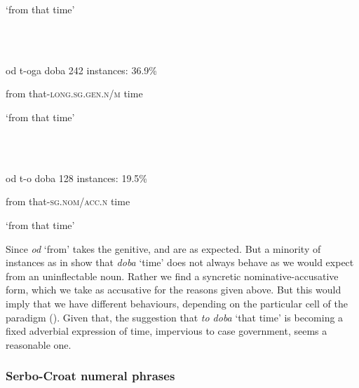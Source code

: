 \documentclass[output=paper]{langscibook}
\begin{document}
  ‘from that time’

\ea%
    \label{ex:key:21}
    \gll \\
         \\
    \glt
    \z %

          od  t-oga   doba    242 instances: 36.9\%

  from  that-\textsc{long}.\textsc{sg.gen.n/m}  time

  ‘from that time’

\ea%
    \label{ex:key:22}
    \gll \\
         \\
    \glt
    \z %

          od  t-o  doba    128 instances: 19.5\%

  from  that-\textsc{sg.nom/acc.n}  time

  ‘from that time’

Since \textit{od} ‘from’ takes the genitive,  and  are as expected. But a minority of instances as in  show that \textit{doba} ‘time’ does not always behave as we would expect from an uninflectable noun. Rather we find a syncretic nominative-accusative form, which we take as accusative for the reasons given above. But this would imply that we have different behaviours, depending on the particular cell of the paradigm (). Given that, the suggestion that \textit{to doba} ‘that time’ is becoming a fixed adverbial expression of time, impervious to case government, seems a reasonable one. 

\subsubsection{\textbf{Serbo-Croat} \textbf{numeral} \textbf{phrases}}
\end{document}
